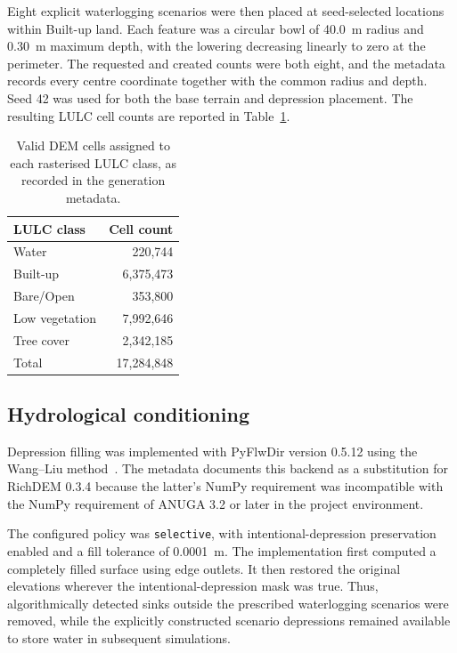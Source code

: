 Eight explicit waterlogging scenarios were then placed at seed-selected
locations within Built-up land.  Each feature was a circular bowl of 40.0~m
radius and 0.30~m maximum depth, with the lowering decreasing linearly to zero
at the perimeter.  The requested and created counts were both eight, and the
metadata records every centre coordinate together with the common radius and
depth.  Seed 42 was used for both the base terrain and depression placement.
The resulting LULC cell counts are reported in Table~\ref{tab:dem-lulc}.

\begin{table}[htbp]
    \centering
    \caption{Valid DEM cells assigned to each rasterised LULC class, as
    recorded in the generation metadata.}
    \label{tab:dem-lulc}
    \begin{tabular}{lr}
        \hline
        LULC class & Cell count \\
        \hline
        Water & 220,744 \\
        Built-up & 6,375,473 \\
        Bare/Open & 353,800 \\
        Low vegetation & 7,992,646 \\
        Tree cover & 2,342,185 \\
        \hline
        Total & 17,284,848 \\
        \hline
    \end{tabular}
\end{table}

\subsection{Hydrological conditioning}

Depression filling was implemented with PyFlwDir version 0.5.12 using the
Wang--Liu method~\cite{WangLiu2006}.  The metadata documents this backend as a
substitution for RichDEM 0.3.4 because the latter's NumPy requirement was
incompatible with the NumPy requirement of ANUGA 3.2 or later in the project
environment.

The configured policy was \texttt{selective}, with intentional-depression
preservation enabled and a fill tolerance of 0.0001~m.  The implementation
first computed a completely filled surface using edge outlets.  It then
restored the original elevations wherever the intentional-depression mask was
true.  Thus, algorithmically detected sinks outside the prescribed
waterlogging scenarios were removed, while the explicitly constructed
scenario depressions remained available to store water in subsequent
simulations.

